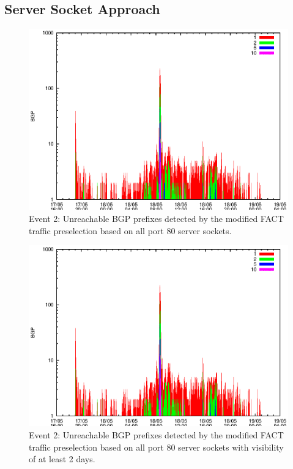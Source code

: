 \subsection{Server Socket Approach}

\begin{figure}
	[p] \centering 
	\includegraphics[width=0.75\linewidth]{images/events/2010_05_18/bgp_log_allPort80SES.eps}
	\caption{Event 2: Unreachable BGP prefixes detected by the modified FACT traffic preselection based on all port 80 server sockets.} 
	\label{fig:TIER1_FACT_allSES80} 
\end{figure}


\begin{figure}
	[p] \centering 
	\includegraphics[width=0.75\linewidth]{images/events/2010_05_18/bgp_log_port80_Set_stab_0_vts_2.eps}
	\caption{Event 2: Unreachable BGP prefixes detected by the modified FACT traffic preselection based on all port 80 server sockets with visibility of at least 2 days.} 
	\label{fig:TIER1_FACT_allSES80VTS2} 
\end{figure}

